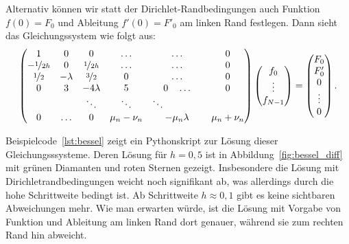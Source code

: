 Alternativ können wir statt der Dirichlet-Randbedingungen auch
Funktion $f(0) = F_0$ und Ableitung $f'(0)=F'_0$ am linken Rand
festlegen. Dann sieht das Gleichungssystem wie folgt aus:
\begin{equation}
  \begin{pmatrix}
    1 & 0         & 0         &\ldots & \ldots & 0\\
    -\nicefrac{1}{2h} & 0         & \nicefrac{1}{2h} &\ldots & \ldots & 0\\
    \nicefrac{1}{2} & -\lambda & \nicefrac{3}{2} & 0 & \ldots & 0\\
    0 & 3         & -4\lambda & 5 & 0\quad \ldots & 0\\
    & & \ddots & \ddots & \ddots\qquad\qquad \\
    0 & \ldots & 0 & \mu_n - \nu_n & -\mu_n\lambda & \mu_n + \nu_n\\
  \end{pmatrix}
  \begin{pmatrix}
    f_0\\
    \vdots\\
    f_{N-1}
  \end{pmatrix}=
  \begin{pmatrix}
    F_0\\
    F'_0\\
    0\\
    \vdots\\
    0 \\
  \end{pmatrix}.
\end{equation}

Beispielcode~\ref{lst:bessel} zeigt ein Pythonskript zur Lösung dieser
Gleichungsssysteme. Deren Lösung für $h=0,5$ ist in
Abbildung~\ref{fig:bessel_diff} mit grünen Diamanten und roten Sternen
gezeigt.  Insbesondere die Lösung mit Dirichletrandbedingungen weicht
noch signifikant ab, was allerdings durch die hohe Schrittweite
bedingt ist. Ab Schrittweite $h\approx 0,1$ gibt es keine sichtbaren
Abweichungen mehr. Wie man erwarten würde, ist die Lösung mit Vorgabe
von Funktion und Ableitung am linken Rand dort genauer, während sie
zum rechten Rand hin abweicht.

